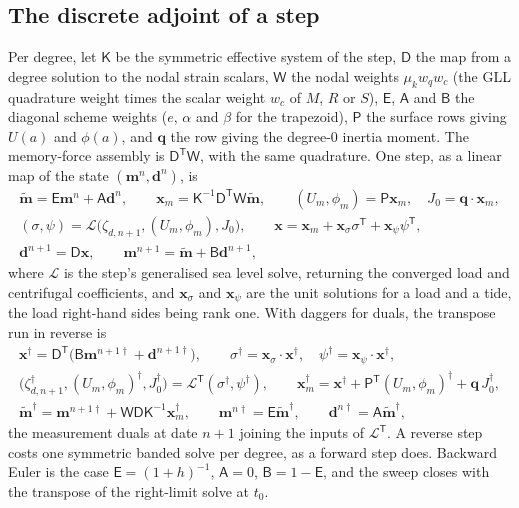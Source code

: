 \documentclass[11pt,a4paper]{article}
\numberwithin{equation}{section}
\begin{document}
\subsection{The discrete adjoint of a step}
\label{sec:discadj}

Per degree, let $\mathsf{K}$ be the symmetric effective system of the step,
$\mathsf{D}$ the map from a degree solution to the nodal strain scalars,
$\mathsf{W}$ the nodal weights $\mu_{k}w_{q}w_{c}$ (the GLL quadrature weight
times the scalar weight $w_{c}$ of $M$, $R$ or $S$), $\mathsf{E}$,
$\mathsf{A}$ and $\mathsf{B}$ the diagonal scheme weights ($e$, $\alpha$ and
$\beta$ for the trapezoid), $\mathsf{P}$ the surface rows giving $U(a)$ and
$\phi(a)$, and $\mathbf{q}$ the row giving the degree-0 inertia moment. The
memory-force assembly is $\mathsf{D}^{\mathsf T}\mathsf{W}$, with the same
quadrature. One step, as a linear map of the state $(\mathbf{m}^{n},\mathbf{d}^{n})$,
is
\begin{gather*}
\tilde{\mathbf{m}} = \mathsf{E}\mathbf{m}^{n} + \mathsf{A}\mathbf{d}^{n},\qquad
\mathbf{x}_{m} = \mathsf{K}^{-1}\mathsf{D}^{\mathsf T}\mathsf{W}\tilde{\mathbf{m}},\qquad
(U_{m},\phi_{m}) = \mathsf{P}\mathbf{x}_{m},\quad J_{0} = \mathbf{q}\cdot\mathbf{x}_{m},\\
(\sigma,\psi) = \mathcal{L}\big(\zeta_{d,n+1}, (U_{m},\phi_{m}), J_{0}\big),\qquad
\mathbf{x} = \mathbf{x}_{m} + \mathbf{x}_{\sigma}\sigma^{\mathsf T} + \mathbf{x}_{\psi}\psi^{\mathsf T},\\
\mathbf{d}^{n+1} = \mathsf{D}\mathbf{x},\qquad
\mathbf{m}^{n+1} = \tilde{\mathbf{m}} + \mathsf{B}\mathbf{d}^{n+1},
\end{gather*}
where $\mathcal{L}$ is the step's generalised sea level solve, returning the
converged load and centrifugal coefficients, and $\mathbf{x}_{\sigma}$ and
$\mathbf{x}_{\psi}$ are the unit solutions for a load and a tide, the load
right-hand sides being rank one. With daggers for duals, the transpose run in
reverse is
\begin{gather*}
\mathbf{x}^{\dagger} = \mathsf{D}^{\mathsf T}\big(\mathsf{B}\mathbf{m}^{n+1\dagger} + \mathbf{d}^{n+1\dagger}\big),\qquad
\sigma^{\dagger} = \mathbf{x}_{\sigma}\cdot\mathbf{x}^{\dagger},\quad
\psi^{\dagger} = \mathbf{x}_{\psi}\cdot\mathbf{x}^{\dagger},\\
\big(\zeta_{d,n+1}^{\dagger}, (U_{m},\phi_{m})^{\dagger}, J_{0}^{\dagger}\big)
 = \mathcal{L}^{\mathsf T}(\sigma^{\dagger},\psi^{\dagger}),\qquad
\mathbf{x}_{m}^{\dagger} = \mathbf{x}^{\dagger} + \mathsf{P}^{\mathsf T}(U_{m},\phi_{m})^{\dagger} + \mathbf{q}\,J_{0}^{\dagger},\\
\tilde{\mathbf{m}}^{\dagger} = \mathbf{m}^{n+1\dagger} + \mathsf{W}\mathsf{D}\mathsf{K}^{-1}\mathbf{x}_{m}^{\dagger},\qquad
\mathbf{m}^{n\dagger} = \mathsf{E}\tilde{\mathbf{m}}^{\dagger},\qquad
\mathbf{d}^{n\dagger} = \mathsf{A}\tilde{\mathbf{m}}^{\dagger},
\end{gather*}
the measurement duals at date $n+1$ joining the inputs of $\mathcal{L}^{\mathsf T}$.
A reverse step costs one symmetric banded solve per degree, as a forward step
does. Backward Euler is the case $\mathsf{E}=(1+h)^{-1}$, $\mathsf{A}=0$,
$\mathsf{B}=1-\mathsf{E}$, and the sweep closes with the transpose of the
right-limit solve at $t_{0}$.
\end{document}
